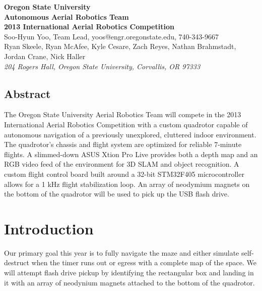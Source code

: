 \documentclass[12pt,letterpaper]{article} \usepackage[margin=1in]{geometry}
\begin{document}
\begin{center}
	{\bf\Large Oregon State University \\
		Autonomous Aerial Robotics Team \\
		2013 International Aerial Robotics Competition \\ [1em]
	}
	{\footnotesize Soo-Hyun Yoo, Team Lead, yoos@engr.oregonstate.edu, 740-343-9667 \\
		Ryan Skeele, Ryan McAfee, Kyle Cesare, Zach Reyes, Nathan Brahmstadt, Jordan Crane, Nick Haller \\ [0.5em]
		\emph{204 Rogers Hall, Oregon State University, Corvallis, OR 97333}
	}
\end{center}


\begin{center} \begin{minipage}{5.5in}

\section*{Abstract}

The Oregon State University Aerial Robotics Team will compete in the 2013
International Aerial Robotics Competition with a custom quadrotor capable of
autonomous navigation of a previously unexplored, cluttered indoor environment.
The quadrotor's chassis and flight system are optimized for reliable 7-minute
flights. A slimmed-down ASUS Xtion Pro Live provides both a depth map and an
RGB video feed of the environment for 3D SLAM and object recognition. A custom
flight control board built around a 32-bit STM32F405 microcontroller allows for
a 1 kHz flight stabilization loop. An array of neodymium magnets on the bottom
of the quadrotor will be used to pick up the USB flash drive.

\end{minipage} \end{center}



\section*{Introduction}

Our primary goal this year is to fully navigate the maze and either simulate
self-destruct when the timer runs out or egress with a complete map of the
space. We will attempt flash drive pickup by identifying the rectangular box
and landing in it with an array of neodynium magnets attached to the bottom of
the quadrotor.
\end{document}
